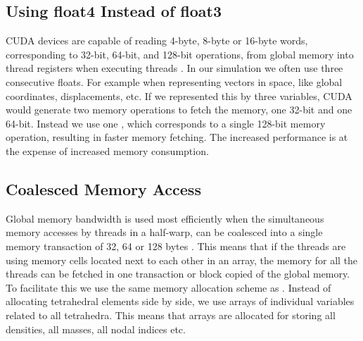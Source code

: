 
\subsection{Using float4 Instead of float3}
CUDA devices are capable of reading 4-byte, 8-byte or 16-byte words,
corresponding to 32-bit, 64-bit, and 128-bit operations,
from global memory into thread registers when executing threads
.
%
In our simulation we often use three consecutive floats. For example when
representing vectors in space, like global coordinates, displacements,
etc. If we represented this by three  variables, CUDA would
generate two memory operations to fetch the memory, one 32-bit and one
64-bit. Instead we use one , which corresponds to a
single 128-bit memory operation, resulting in faster memory
fetching. The increased performance is at the expense of increased
memory consumption.

\subsection{Coalesced Memory Access}
Global memory bandwidth is used most efficiently when the simultaneous
memory accesses by threads in a half-warp, can be coalesced into a
single memory transaction of 32, 64 or 128 bytes
.
%
This means that if the threads are using memory cells located
next to each other in an array, the memory for all the threads
can be fetched in one transaction or block copied of the global memory.
%
To facilitate this we use the same memory allocation scheme as 
. Instead of allocating
tetrahedral elements side by side, we use arrays of individual
variables related to all tetrahedra. This means that arrays are
allocated for storing all densities, all masses, all nodal indices
etc.


